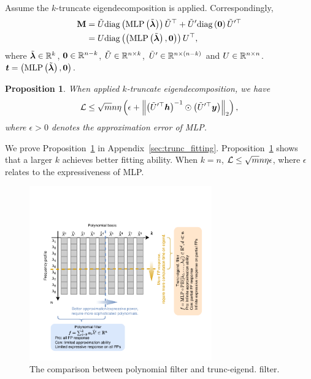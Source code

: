 \documentclass{article} %
\def\vlambda{{\bm\lambda}}
\newtheorem{proposition}{\textbf{Proposition}} %
\begin{document}
Assume the $k$-truncate eigendecomposition is applied.
Correspondingly,
\begin{equation}
	\begin{aligned}
		\rmM&=\tilde U\mathrm{diag}\left(\mathrm{MLP}\left(\tilde\vlambda\right)\right)\tilde U^{\top}+\tilde U^{\prime}\mathrm{diag}\left(\mathbf 0\right)\tilde U^{\prime\top}\\
		&=U\mathrm{diag}\left(\left(\mathrm{MLP}\left(\tilde\vlambda\right),\mathbf 0\right)\right)U^{\top},
	\end{aligned}
\end{equation}
where $\tilde\vlambda\in\sR^k$, $\mathbf 0\in{\mathbb{R}}^{n-k}$, $\tilde U\in{\mathbb{R}}^{n\times k}$, $\tilde U^{\prime}\in{\mathbb{R}}^{n\times(n-k)}$ and $U\in{\mathbb{R}}^{n\times n}$.
$\vt=\left(\mathrm{MLP}\left(\tilde\vlambda\right),\mathbf 0\right)$.

\begin{proposition}
	\label{prop:trunc_fitting}
	When applied $k$-truncate eigendecomposition, we have
	\begin{equation}
		\begin{aligned}
			{\mathcal{L}}\leq\sqrt{m}n\eta\left(\epsilon+\left\|\left(\tilde U^{\prime\top}{\bm{h}}\right)^{-1}\odot\left(\tilde U^{\prime\top}{\bm{y}}\right)\right\|_2\right),
		\end{aligned}
	\end{equation}
	where $\epsilon>0$ denotes the approximation error of MLP.
\end{proposition}
We prove Proposition~\ref{prop:trunc_fitting} in Appendix~\ref{sec:trunc_fitting}.
Proposition~\ref{prop:trunc_fitting} shows that a larger $k$ achieves better fitting ability.
When $k=n$, ${\mathcal{L}}\leq\sqrt{m}n\eta\epsilon$, where $\epsilon$ relates to the expressiveness of MLP.

\begin{figure}[h]
	\centering
	\includegraphics[width=0.7\textwidth]{figure/poly_trunc2}
	\caption{The comparison between polynomial filter and trunc-eigend. filter.}
	\label{fig:spec_expr}
\end{figure}
\end{document}
